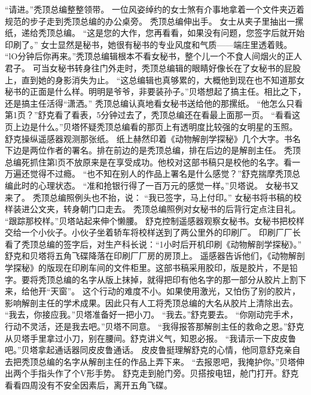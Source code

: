 \documentclass[a4paper,12pt,UTF8,twoside]{ctexbook}
\begin{document}
        “请进。”秃顶总编整整领带。 
        一位风姿绰约的女士煞有介事地拿着一个文件夹迈着规范的步子走到秃顶总编的办公桌旁。 
        秃顶总编伸出手。 
        女士从夹子里抽出一摞纸，递给秃顶总编。 
        “这是您的大作，您再看看，如果没有问题，您签字后就开始印刷了。” 
        女士显然是秘书，她很有秘书的专业风度和气质——端庄里透着贱。 
        “lO分钟后你再来。”秃顶总编辑根本不看女秘书，整个儿一个不食人间烟火的正人君子。 
        可当女秘书转身往门外走时，秃顶总编辑的眼睛好像长在了女秘书的屁股上，直到她的身影消失为止。 
        “这总编辑也真够累的，大概他到现在也不知道那女秘书的正面是什么样。明明是爷爷，非要装孙子。”贝塔想起了搞主任。相比之下，还是搞主任活得“潇洒。” 
        秃顶总编认真地看女秘书送给他的那摞纸。 
        “他怎么只看第1页？”舒克看了看表，5分钟过去了，秃顶总编还在看最上面那一页。 
        “看看这页上边是什么。”贝塔怀疑秃顶总编看的那页上有透明度比较强的女明星的玉照。 
        舒克操纵遥感器观测那张纸。 
        纸上赫然印着《动物解剖学探秘》几个大字。书名下边是两位作者的署名。排在前边的是秃顶总编，排在后边的是解剖主任。 
        秃顶总编死抓住第l页不放原来是在享受成功。他校对这部书稿只是校他的名字。看一万遍还觉得不过瘾。 
        “也不知在别人的作品上署名是什么感觉？”舒克揣摩秃顶总编此时的心理状态。 
        “准和抢银行得了一百万元的感觉一样。”贝塔说。 
        女秘书又来了。 
        秃顶总编照例头也不抬，说：  “我已签字，马上付印。” 
        女秘书将书稿的校样装进公文夹，转身朝门口走去。 
        秃顶总编照例对女秘书的后背行定点注目礼。 
        “跟踪那校样。”贝塔站起来伸个懒腰。 
        舒克控制遥感器观察女秘书。女秘书把校样交给一个小伙子。小伙子坐着轿车将校样送到了两公里外的印刷厂。 
        印刷厂厂长看了秃顶总编的签字后，对生产科长说：“1小时后开机印刷《动物解剖学探秘》。” 
        舒克和贝塔将五角飞碟降落在印刷厂厂房的房顶上。 
        遥感器告诉他们，《动物解剖学探秘》的版现在印刷车间的文件柜里。这部书稿采用胶印，版是胶片，不是铅字。要将秃顶总编的名字从版上抹掉，就得把印有他名字的那一部分从胶片上割下来，给他开“天窗”。 
        这个行动的难度不小。如果使用激光，又怕伤了别的胶片，影响解剖主任的学术成果。因此只有人工将秃顶总编的大名从胶片上清除出去。 
        “我去，你接应我。”贝塔准备好一把小刀。 
        “我去。”舒克要去。 
        “你刚动完手术，行动不灵活，还是我去吧。”贝塔不同意。 
        “我得报答那解剖主任的救命之恩。”舒克从贝塔手里拿过小刀，别在腰间。舒克讲义气，知恩必报。 
        “我请示一下皮皮鲁吧。”贝塔拿起通话器同皮皮鲁通话。 
        皮皮鲁挺理解舒克的心情，他同意舒克亲自去把秃顶总编的名字从解剖主任的作品上弄下来。 
        “去报恩吧，我掩护你。”贝塔伸出两个手指头作了个V形手势。 
        舒克走到舱门旁。贝搭按电钮，舱门打开。舒克看看四周没有不安全因素后，离开五角飞碟。 
\end{document}
